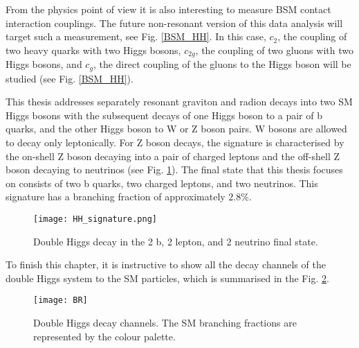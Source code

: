 From the physics point of view it is also interesting to measure BSM contact interaction couplings. The future non-resonant version of this data analysis will target such a measurement, see Fig. \ref{BSM_HH}. In this case, $c_2$, the coupling of two heavy quarks with two Higgs bosons, $c_{2g}$, the coupling of two gluons with two Higgs bosons, and $c_g$, the direct coupling of the gluons to the Higgs boson will be studied (see Fig. \ref{BSM_HH}). 



This thesis addresses separately resonant graviton and radion decays into two SM Higgs bosons with the subsequent decays of one Higgs boson to a pair of b quarks, and the other Higgs boson to W or Z boson pairs. W bosons are allowed to decay only leptonically. For Z boson decays, the signature is characterised by the on-shell Z boson decaying into a pair of charged leptons and the off-shell Z boson decaying to neutrinos (see Fig. \ref{HH_signature}). The final state that this thesis focuses on consists of two b quarks, two charged leptons, and two neutrinos. This signature has a branching fraction of approximately $2.8 \%$. 

\begin{figure}[H]
  \centering
    \texttt{[image: HH\_signature.png]}
    \caption{Double Higgs decay in the 2 b, 2 lepton, and 2 neutrino final state. }
    \label{HH_signature}
\end{figure}

To finish this chapter, it is instructive to show all the decay channels of the double Higgs system to the SM particles, which is summarised in the Fig. \ref{BR}. 

\begin{figure}[H]
  \centering
    \texttt{[image: BR]}
    \caption[Double Higgs decay channels]{Double Higgs decay channels. The SM branching fractions are represented by the colour palette.}
    \label{BR}
\end{figure}



